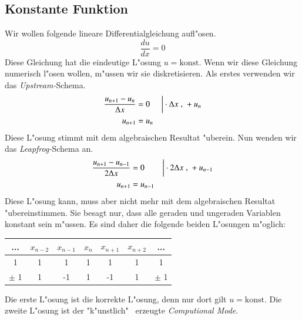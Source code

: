 \begin{refsection}
\subsection{Konstante Funktion}
Wir wollen folgende lineare Differentialgleichung aufl"osen.
\begin{equation}
	\frac{d u }{dx} = 0
\end{equation}
Diese Gleichung hat die eindeutige L"osung $u\! =\! \text{konst.}
$ Wenn wir diese Gleichung numerisch l"osen wollen, m"ussen wir sie
diskretisieren. Als erstes verwenden wir das \textit{Upstream-}Schema.
\begin{align}
	\frac{u_{n+1}-u_n}{\Delta x}  &= 0 &\bigg| \cdot \Delta x \; \text{,} \; +u_n \notag \\
	u_{n+1} &= u_n
\end{align}
Diese L"osung stimmt mit dem algebraischen Resultat "uberein. Nun wenden
wir das \textit{Leapfrog-}Schema an.
\begin{align}
	\frac{u_{n+1}-u_{n-1}}{2 \Delta x}  &= 0 &\bigg| \cdot 2 \Delta x \; \text{,} \; +u_{n-1} \notag \\
	u_{n+1} &= u_{n-1}
\end{align}
Diese L"osung kann, muss aber nicht mehr mit dem algebraischen Resultat
"ubereinstimmen. Sie besagt nur, dass alle geraden und ungeraden
Variablen konstant sein m"ussen. Es sind daher die folgende beiden
L"osungen m"oglich:
\begin{center}
	\begin{tabular}{c|c|c|c|c|c|c}

		...	&	{$x_{n-2}$} 	& {$x_{n-1}$} 	& {$x_{n}$} & {$x_{n+1}$} & {$x_{n+2}$}	&	... \\
		\hline
		1	&	1	& 	1	&	1	&	1	&	1	&	1 \\
		\hline
		$\pm$ 1	&	1	& 	-1	&	1	&	-1	&	1	&	$\pm$ 1 \\
	\end{tabular}
\end{center}
Die erste L"osung ist die korrekte L"osung, denn nur dort gilt
$u\!=\! \text{konst.}$ Die zweite L"osung ist der "k"unstlich" \,
erzeugte \textit{Computional Mode}.


\end{refsection}
